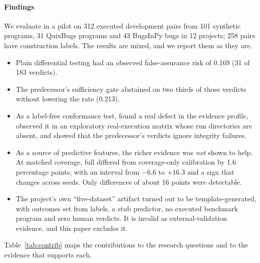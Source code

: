 \paragraph*{Findings} We evaluate \sbg{} in a pilot on 312 executed development pairs from 101 synthetic programs, 31 QuixBugs programs and 43 BugsInPy bugs in 12 projects; 258 pairs have construction labels. The results are mixed, and we report them as they are.
\begin{itemize}
\item Plain differential testing had an observed false-assurance risk of 0.169 (31 of 183 \NDO{} verdicts).
\item The predecessor's sufficiency gate abstained on two thirds of those verdicts without lowering the rate (0.213).
\item As a label-free conformance test, \ers{} found a real defect in the evidence profile, observed it in an exploratory real-execution matrix whose run directories are absent, and showed that the predecessor's verdicts ignore integrity failures.
\item As a source of predictive features, the richer evidence was \emph{not} shown to help. At matched coverage, full \cec{} differed from coverage-only calibration by 1.6 percentage points, with an interval from $-6.6$ to $+16.3$ and a sign that changes across seeds. Only differences of about 16 points were detectable.
\item The project's own ``five-dataset'' artifact turned out to be template-generated, with outcomes set from labels, a stub predictor, no executed benchmark program and zero human verdicts. It is invalid as external-validation evidence, and this paper excludes it.
\end{itemize}

Table~\ref{tab:contrib} maps the contributions to the research questions and to the evidence that supports each.

